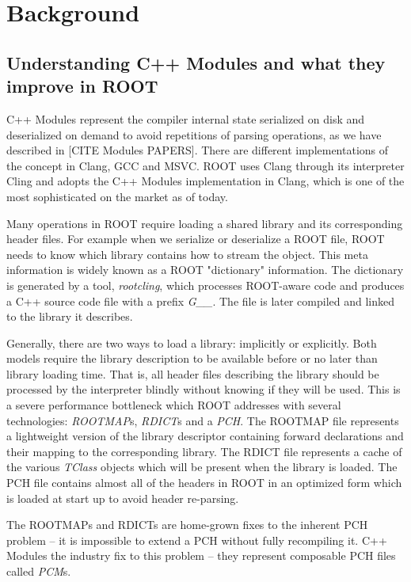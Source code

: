\documentclass[12pt]{iopart}
\begin{document}

\section{Background}

\subsection{Understanding C++ Modules and what they improve in ROOT}
\label{intro}

C++ Modules represent the compiler internal state serialized on disk and deserialized on demand to avoid repetitions of parsing operations, as we have described in [CITE Modules PAPERS]. There are different implementations of the concept in Clang, GCC and MSVC. ROOT uses Clang through its interpreter Cling and adopts the C++ Modules implementation in Clang, which is one of the most sophisticated on the market as of today.

Many operations in ROOT require loading a shared library and its corresponding header files. For example when we serialize or deserialize a ROOT file, ROOT needs to know which library contains how to stream the object. This meta information is widely known as a ROOT "dictionary" information. The dictionary is generated by a tool, \textit{rootcling}, which processes ROOT-aware code and produces a C++ source code file with a prefix \textit{G\_\_}. The file is later compiled and linked to the library it describes.

Generally, there are two ways to load a library: implicitly or explicitly. Both models require the library description to be available before or no later than library loading time. That is, all header files describing the library should be processed by the interpreter blindly without knowing if they will be used. This is a severe performance bottleneck which ROOT addresses with several technologies: \textit{ROOTMAP}s, \textit{RDICT}s and a \textit{PCH}. The ROOTMAP file represents a lightweight version of the library descriptor containing forward declarations and their mapping to the corresponding library. The RDICT file represents a cache of the various \textit{TClass} objects which will be present when the library is loaded. The PCH file contains almost all of the headers in ROOT in an optimized form which is loaded at start up to avoid header re-parsing.

The ROOTMAPs and RDICTs are home-grown fixes to the inherent PCH problem -- it is impossible to extend a PCH without fully recompiling it. C++ Modules the industry fix to this problem -- they represent composable PCH files called \textit{PCM}s.
\end{document}
